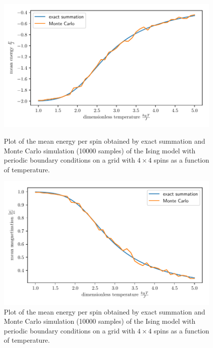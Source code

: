 \documentclass[a4paper,10pt,bibtotoc]{scrartcl}
\begin{document}
\begin{figure}[H]
	\centering
	\includegraphics[width=\linewidth]{energy_mc.pdf}
	\caption{Plot of the mean energy per spin obtained by exact summation and Monte Carlo simulation (10000 samples) of the Ising model with periodic boundary conditions on a grid with $4\times 4$ spins as a function of temperature.}
	\label{fig:fig10}
	\includegraphics[width=\linewidth]{magnetization_mc.pdf}
	\caption{Plot of the mean energy per spin obtained by exact summation and Monte Carlo simulation (10000 samples) of the Ising model with periodic boundary conditions on a grid with $4\times 4$ spins as a function of temperature.}
	\label{fig:fig11}
\end{figure}
\end{document}
